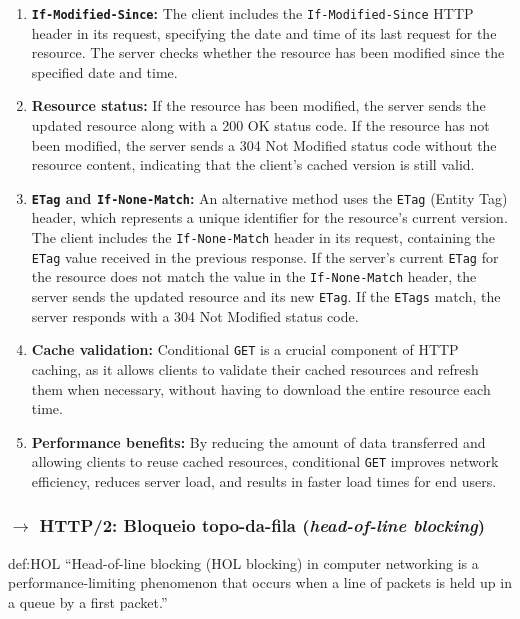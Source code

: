 \begin{enumerate}
    \item \textbf{\texttt{If-Modified-Since}:} The client includes the \texttt{If-Modified-Since} HTTP header in its request, specifying the date and time of its last request for the resource. The server checks whether the resource has been modified since the specified date and time.
    \item \textbf{Resource status:} If the resource has been modified, the server sends the updated resource along with a 200 OK status code. If the resource has not been modified, the server sends a 304 Not Modified status code without the resource content, indicating that the client's cached version is still valid.
    \item \textbf{\texttt{ETag} and \texttt{If-None-Match}:} An alternative method uses the \texttt{ETag} (Entity Tag) header, which represents a unique identifier for the resource's current version. The client includes the \texttt{If-None-Match} header in its request, containing the \texttt{ETag} value received in the previous response. If the server's current \texttt{ETag} for the resource does not match the value in the \texttt{If-None-Match} header, the server sends the updated resource and its new \texttt{ETag}. If the \texttt{ETags} match, the server responds with a 304 Not Modified status code.
    \item \textbf{Cache validation:} Conditional \texttt{GET} is a crucial component of HTTP caching, as it allows clients to validate their cached resources and refresh them when necessary, without having to download the entire resource each time.
    \item \textbf{Performance benefits:} By reducing the amount of data transferred and allowing clients to reuse cached resources, conditional \texttt{GET} improves network efficiency, reduces server load, and results in faster load times for end users.
\end{enumerate}

\clearpage
\subsubsection[2.2.8 HTTP/2: Bloqueio topo-da-fila (\textit{head-of-line blocking})]{$\pmb{\rightarrow}$ HTTP/2: Bloqueio topo-da-fila (\textit{head-of-line blocking})} %

\begin{theo}{def:HOL}\label{def:HOL}
    ``Head-of-line blocking (HOL blocking) in computer networking is a performance-limiting phenomenon that occurs when a line of packets is held up in a queue by a first packet.''
\end{theo}

